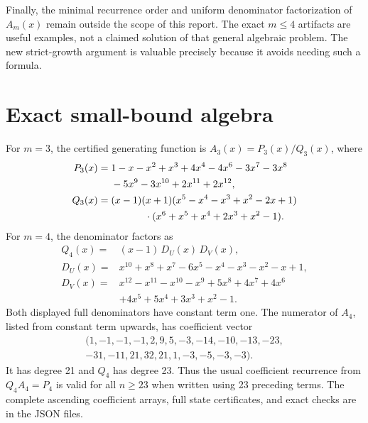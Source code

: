 \documentclass[11pt,a4paper]{article}
\theoremstyle{definition}\newaliascnt{definition}{theorem}
\theoremstyle{remark}\newaliascnt{remark}{theorem}
\begin{document}
Finally, the minimal recurrence order and uniform denominator factorization
of $A_m(x)$ remain outside the scope of this report. The exact $m\le4$
artifacts are useful examples, not a claimed solution of that general
algebraic problem. The new strict-growth argument is valuable precisely
because it avoids needing such a formula.

\appendix
\section{Exact small-bound algebra}
\label{app:algebra}
For $m=3$, the certified generating function is $A_3(x)=P_3(x)/Q_3(x)$, where
\begin{align*}
 P_3(x)={}&1-x-x^2+x^3+4x^4-4x^6-3x^7-3x^8\\
          &-5x^9-3x^{10}+2x^{11}+2x^{12},\\
 Q_3(x)={}&(x-1)(x+1)
 (x^5-x^4-x^3+x^2-2x+1)\\
          &\hspace{12mm}\cdot(x^6+x^5+x^4+2x^3+x^2-1).
\end{align*}
For $m=4$, the denominator factors as
\begin{align*}
 Q_4(x)={}&(x-1)\,D_U(x)\,D_V(x),\\
 D_U(x)={}&x^{10}+x^8+x^7-6x^5-x^4-x^3-x^2-x+1,\\
 D_V(x)={}&x^{12}-x^{11}-x^{10}-x^9+5x^8+4x^7+4x^6\\
          &+4x^5+5x^4+3x^3+x^2-1.
\end{align*}
Both displayed full denominators have constant term one. The numerator
of $A_4$, listed from constant term upwards, has coefficient vector
\[
\begin{gathered}
(1,-1,-1,-1,2,9,5,-3,-14,-10,-13,-23,\\
 -31,-11,21,32,21,1,-3,-5,-3,-3).
\end{gathered}
\]
It has degree 21 and $Q_4$ has degree 23. Thus the usual coefficient
recurrence from $Q_4A_4=P_4$ is valid for all $n\ge23$ when written using
23 preceding terms. The complete ascending coefficient arrays, full state
certificates, and exact checks are in the JSON files.
\end{document}

